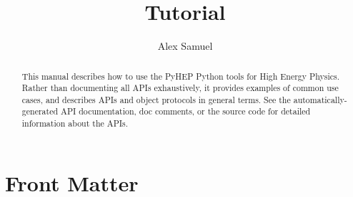\documentclass{manual}
\title{\pyhep Tutorial}
\author{Alex Samuel}
\newcommand{\pyhep}{PyHEP\xspace}
\begin{document}
\maketitle

\ifhtml
\chapter*{Front Matter\label{front}}
\fi

% 

\begin{abstract}

\noindent
This manual describes how to use the \pyhep Python tools for High Energy
Physics.  Rather than documenting all APIs exhaustively, it provides
examples of common use cases, and describes APIs and object protocols in
general terms.  See the automatically-generated API documentation, doc
comments, or the source code for detailed information about the APIs.


\end{abstract}

\tableofcontents















\appendix

% 

% 


\end{document}
